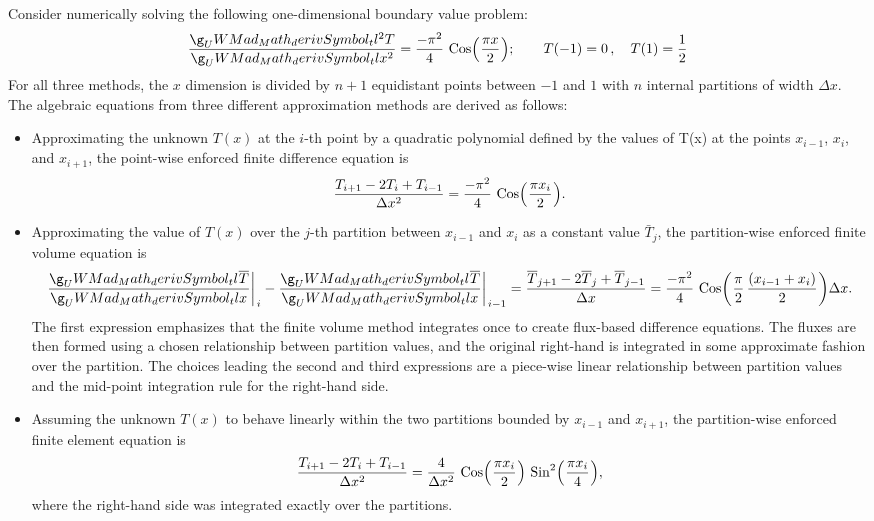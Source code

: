 \documentclass[12pt]{../UWMadThesis}
\begin{document}
Consider numerically solving the following one-dimensional boundary value problem:
\begin{equation}
    \deriv{T}{x}{2} = \frac{-\pi^2}{4}\,\Cos\left(\frac{\pi x}{2}\right);\quad\quad T(-1) = 0\,,\quad T(1) = \frac{1}{2}
    \label{Eqn:NM_Example_BVP}
\end{equation}
For all three methods, the $x$ dimension is divided by $n+1$ equidistant points between $-1$ and $1$ with $n$ internal partitions of width $\Delta{x}$.
The algebraic equations from three different approximation methods are derived as follows:
\begin{itemize}
	\item{
        Approximating the unknown $T(x)$ at the $i$-th point by a quadratic polynomial defined by the values of T(x) at the points $x_{i-1}$, $x_{i}$, and $x_{i+1}$, the point-wise enforced finite difference equation is
        \begin{equation}
            \frac{T_{i+1} - 2 T_i + T_{i-1}}{\Delta{x}^2} = \frac{-\pi^2}{4}\,\Cos\left(\frac{\pi x_i}{2}\right).
        \end{equation}
    }
    \item{
        Approximating the value of $T(x)$ over the $j$-th partition between $x_{i-1}$ and $x_{i}$ as a constant value $\bar{T}_{j}$, the partition-wise enforced finite volume equation is
        \begin{equation}
            \deriv{\bar{T}}{x}\bigg\rvert_{i} - \deriv{\bar{T}}{x}\bigg\rvert_{i-1} = 
            \frac{\bar{T}_{j+1} - 2 \bar{T}_j + \bar{T}_{j-1}}{\Delta{x}} = \frac{-\pi^2}{4}\,\Cos\left(\frac{\pi}{2}\,\frac{(x_{i-1}+x_i)}{2}\right) \Delta{x}.
        \end{equation}
        The first expression emphasizes that the finite volume method integrates once to create flux-based difference equations.
        The fluxes are then formed using a chosen relationship between partition values, and the original right-hand is integrated in some approximate fashion over the partition.  The choices leading the second and third expressions are a piece-wise linear relationship between partition values and the mid-point integration rule for the right-hand side.
    }
    \item{
        Assuming the unknown $T(x)$ to behave linearly within the two partitions bounded by $x_{i-1}$ and $x_{i+1}$, the partition-wise enforced finite element equation is
        \begin{equation}
            \frac{T_{i+1} - 2 T_i + T_{i-1}}{\Delta{x}^2} = \frac{4}{\Delta{x}^2}\,\Cos\left(\frac{\pi x_i}{2}\right)\,\Sin^2\left(\frac{\pi x_i}{4}\right),
        \end{equation}
        where the right-hand side was integrated exactly over the partitions.
    }
\end{itemize}
\end{document}
